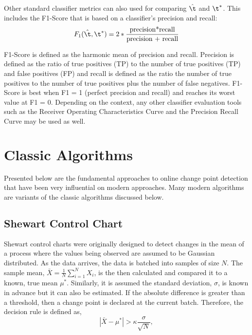 
Other standard classifier metrics can also used for comparing $\hat{\t}$ and $\t^*$. This includes the  F1-Score that is based on a classifier's precision and recall:
\begin{equation}
F_1(\hat{\t}, \t^*) = 2 * \frac{\text{precision*recall}}{\text{precision + recall}}
\end{equation}

 F1-Score is defined as the harmonic mean of precision and recall. Precision is defined as the ratio of true positives (TP) to the
number of true positives (TP) and false positives (FP) and recall is defined as the ratio the number of true positives to the
number of true positives plus the number of false negatives. F1-Score is best when F1 = 1 (perfect precision and recall) and reaches its worst value at F1 = 0. Depending on the context, any other classifier evaluation tools such as the Receiver Operating Characteristics Curve and the Precision Recall Curve may be used as well.

\section{Classic Algorithms}
Presented below are the fundamental approaches to online change point detection that have been very influential on modern approaches. Many modern algorithms are variants of the classic algorithms discussed below.

\subsection{Shewart Control Chart}
Shewart control charts were originally designed to detect changes in the mean of a process where the values being observed are assumed to be Gaussian distributed. As the data arrives, the data is batched into samples of size $N$. The sample mean, $\bar{X}=\frac{1}{N} \sum_{i=1}^N X_i$, is the then calculated and compared it to a known, true mean $\mu^*$.  Similarly, it is assumed the standard deviation, $\sigma$, is known in advance but it can also be estimated. If the absolute difference is greater than a threshold, then a change point is declared at the current batch. Therefore, the decision rule is defined as,
\begin{equation}
|\bar{X}-\mu^*| > \kappa \frac{\sigma}{\sqrt{N}},
\end{equation}

